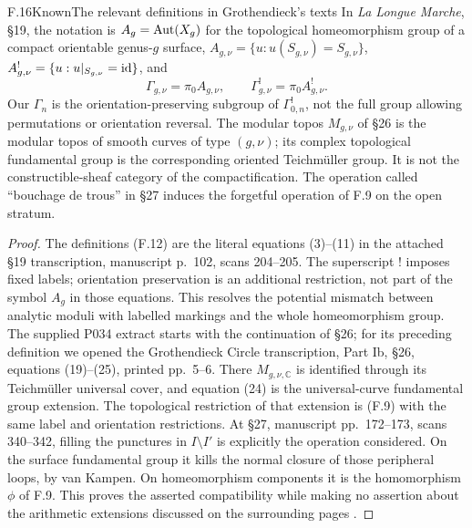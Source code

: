 \begin{statement}{F.16}{Known}{The relevant definitions in Grothendieck's
texts}
In \emph{La Longue Marche}, \S19, the notation is
$A_g=\operatorname{Aut}(X_g)$ for the topological homeomorphism group of a compact
orientable genus-$g$ surface,
$A_{g,\nu}=\{u:u(S_{g,\nu})=S_{g,\nu}\}$,
$A_{g,\nu}^{!}=\{u:u|_{S_{g,\nu}}=\mathrm{id}\}$, and
\[
 \Gamma_{g,\nu}=\pi_0 A_{g,\nu},\qquad
 \Gamma_{g,\nu}^{!}=\pi_0 A_{g,\nu}^{!}.               \tag{F.12}
\]
Our $\Gamma_n$ is the orientation-preserving subgroup of
$\Gamma_{0,n}^{!}$, not the full group allowing permutations or
orientation reversal.  The modular topos $M_{g,\nu}$ of \S26 is the
modular topos of smooth curves of type $(g,\nu)$; its complex
topological fundamental group is the corresponding oriented
Teichm\"uller group.  It is not the constructible-sheaf category of
the compactification.  The operation called ``bouchage de trous'' in
\S27 induces the forgetful operation of F.9 on the open stratum.
\end{statement}
\begin{proof}
The definitions (F.12) are the literal equations (3)--(11) in the
attached \S19 transcription, manuscript p.~102, scans 204--205.
The superscript $!$ imposes fixed labels; orientation preservation is
an additional restriction, not part of the symbol $A_g$ in those
equations.  This resolves the potential mismatch between analytic
moduli with labelled markings and the whole homeomorphism group.
The supplied P034 extract starts with the continuation of \S26;
for its preceding definition we opened the Grothendieck Circle
transcription, Part Ib, \S26, equations (19)--(25), printed pp.~5--6.
There $M_{g,\nu,\mathbb C}$ is identified through its Teichm\"uller
universal cover, and equation (24) is the universal-curve fundamental
group extension.  The topological restriction of that extension is
(F.9) with the same label and orientation restrictions.  At \S27,
manuscript pp.~172--173, scans 340--342, filling the punctures in
$I\setminus I'$ is explicitly the operation considered.  On the
surface fundamental group it kills the normal closure of those
peripheral loops, by van Kampen.  On homeomorphism components it is
the homomorphism $\phi$ of F.9.  This proves the asserted
compatibility while making no assertion about the arithmetic
extensions discussed on the surrounding pages
\citep[\S\S19,26--27]{FGrothendieckLM1981}.
\end{proof}

